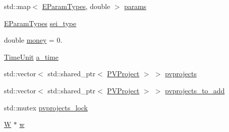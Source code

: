 {\bf }\par
\begin{DoxyCompactItemize}
\item 
std\+::map$<$ \hyperlink{namespacesolar__core_aa1147341e5ef7a40d68d1bd68e149362}{E\+Param\+Types}, double $>$ \hyperlink{classsolar__core_1_1_s_e_i_a811b998092171224983f9aefaa974707}{params}
\item 
\hyperlink{namespacesolar__core_aa1147341e5ef7a40d68d1bd68e149362}{E\+Param\+Types} \hyperlink{classsolar__core_1_1_s_e_i_a788ef7ae27cee8b9b99b57eba9ab2981}{sei\+\_\+type}
\item 
double \hyperlink{classsolar__core_1_1_s_e_i_a8ab5ab03ef726a3354b7c0e0d18da82a}{money} = 0.
\item 
\hyperlink{namespacesolar__core_a4b5949d07259da6f8a20d12a30403e90}{Time\+Unit} \hyperlink{classsolar__core_1_1_s_e_i_abf17b36abf722993d5ad53710579d402}{a\+\_\+time}
\end{DoxyCompactItemize}

{\bf }\par
\begin{DoxyCompactItemize}
\item 
std\+::vector$<$ std\+::shared\+\_\+ptr$<$ \hyperlink{classsolar__core_1_1_p_v_project}{P\+V\+Project} $>$ $>$ \hyperlink{classsolar__core_1_1_s_e_i_a76d9d151e51465d534ff0fd3d64f98bc}{pvprojects}
\item 
std\+::vector$<$ std\+::shared\+\_\+ptr$<$ \hyperlink{classsolar__core_1_1_p_v_project}{P\+V\+Project} $>$ $>$ \hyperlink{classsolar__core_1_1_s_e_i_a99fe003b8fd35b6ef44dec39ed374ffe}{pvprojects\+\_\+to\+\_\+add}
\item 
std\+::mutex \hyperlink{classsolar__core_1_1_s_e_i_adc031a01a6acf03d68b6d0037a2c8a30}{pvprojects\+\_\+lock}
\end{DoxyCompactItemize}

{\bf }\par
\begin{DoxyCompactItemize}
\item 
\hyperlink{classsolar__core_1_1_w}{W} $\ast$ \hyperlink{classsolar__core_1_1_s_e_i_a82e0c6b5f6d83639a08c1bc357fd3466}{w}
\end{DoxyCompactItemize}

